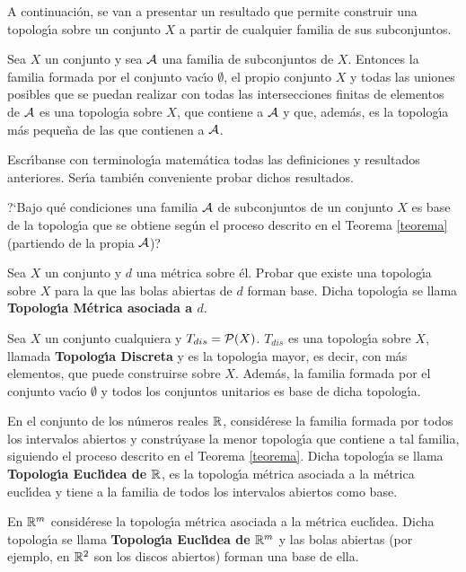 \documentclass[cursovd_portada.tex]{subfiles}
\begin{document}
A continuaci\'{o}n, se van a presentar un resultado que permite construir una topolog\'{\i}a sobre un conjunto $X$ a partir
de cualquier familia de sus subconjuntos.
\begin{teorema}\label{teorema}
Sea $X$ un conjunto y sea ${\cal A}$ una familia de subconjuntos de $X$. Entonces la familia formada por el
conjunto vac\'{\i}o $\emptyset$, el propio conjunto $X$ y todas las uniones posibles que se puedan realizar con todas
las intersecciones finitas de elementos de ${\cal A}$ es una topolog\'{\i}a sobre $X$, que contiene a ${\cal A}$ y que,
adem\'{a}s, es la topolog\'{\i}a m\'{a}s peque\~{n}a de las que contienen a ${\cal A}$.
\end{teorema}
\begin{ejer}
\begin{enumerate}
{\rm
\item Escr\'{\i}banse con terminolog\'{\i}a matem\'{a}tica todas las definiciones y resultados anteriores. Ser\'{\i}a tambi\'{e}n
conveniente probar dichos resultados.
\item ?`Bajo qu\'{e} condiciones una familia ${\cal A}$ de subconjuntos de un conjunto $X$ es base de la topolog\'{\i}a que
se obtiene seg\'{u}n el proceso descrito en el Teorema \ref{teorema} (partiendo de la propia ${\cal A}$)?
\item Sea $X$ un conjunto y $d$ una m\'{e}trica sobre \'{e}l. Probar que existe una topolog\'{\i}a sobre $X$ para la que las
bolas abiertas de $d$ forman base. Dicha topolog\'{\i}a se llama {\bf Topolog\'{\i}a M\'{e}trica asociada a $d$}.}
\end{enumerate}
\end{ejer}
\begin{ejer}
\begin{enumerate}
{\rm
\item Sea $X$ un conjunto cualquiera y $T_{dis}={\cal P}(X)$. $T_{dis}$ es una topolog\'{\i}a sobre $X$, llamada {\bf
Topolog\'{\i}a Discreta} y es la topolog\'{\i}a mayor, es decir, con m\'{a}s elementos, que puede construirse sobre $X$. Adem\'{a}s,
la familia formada por el conjunto vac\'{\i}o $\emptyset$ y todos los conjuntos unitarios es base de dicha topolog\'{\i}a.
\item En el conjunto de los n\'{u}meros reales $\mathbb{R}$, consid\'{e}rese la familia formada por todos los intervalos abiertos
y constr\'{u}yase la menor topolog\'{\i}a que contiene a tal familia, siguiendo el proceso descrito en el Teorema \ref{teorema}.
Dicha topolog\'{\i}a se llama {\bf Topolog\'{\i}a Eucl\'{\i}dea de $\mathbb{R}$}, es la topolog\'{\i}a m\'{e}trica asociada a la m\'{e}trica eucl\'{\i}dea
y tiene a la familia de todos los intervalos abiertos como base.
\item En $\mathbb{R}^m$ consid\'{e}rese la topolog\'{\i}a m\'{e}trica asociada a la m\'{e}trica eucl\'{\i}dea. Dicha topolog\'{\i}a se llama {\bf
Topolog\'{\i}a Eucl\'{\i}dea de $\mathbb{R}^m$} y las bolas abiertas (por ejemplo, en $\mathbb{R}^2$ son los discos abiertos) forman una
base de ella.}
\end{enumerate}
\end{ejer}
\end{document}
